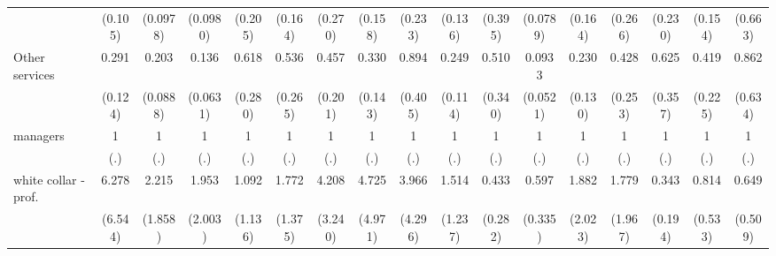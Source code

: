 {\begin{tabular}{l*{16}{c}}
                    &     (0.105)         &    (0.0978)         &    (0.0980)         &     (0.205)         &     (0.164)         &     (0.270)         &     (0.158)         &     (0.233)         &     (0.136)         &     (0.395)         &    (0.0789)         &     (0.164)         &     (0.266)         &     (0.230)         &     (0.154)         &     (0.663)         \\
[1em]
Other services      &       0.291\sym{**} &       0.203\sym{***}&       0.136\sym{***}&       0.618         &       0.536         &       0.457         &       0.330\sym{*}  &       0.894         &       0.249\sym{**} &       0.510         &      0.0933\sym{***}&       0.230\sym{**} &       0.428         &       0.625         &       0.419         &       0.862         \\
                    &     (0.124)         &    (0.0888)         &    (0.0631)         &     (0.280)         &     (0.265)         &     (0.201)         &     (0.143)         &     (0.405)         &     (0.114)         &     (0.340)         &    (0.0521)         &     (0.130)         &     (0.253)         &     (0.357)         &     (0.225)         &     (0.634)         \\
[1em]
managers            &           1         &           1         &           1         &           1         &           1         &           1         &           1         &           1         &           1         &           1         &           1         &           1         &           1         &           1         &           1         &           1         \\
                    &         (.)         &         (.)         &         (.)         &         (.)         &         (.)         &         (.)         &         (.)         &         (.)         &         (.)         &         (.)         &         (.)         &         (.)         &         (.)         &         (.)         &         (.)         &         (.)         \\
[1em]
white collar - prof.&       6.278         &       2.215         &       1.953         &       1.092         &       1.772         &       4.208         &       4.725         &       3.966         &       1.514         &       0.433         &       0.597         &       1.882         &       1.779         &       0.343         &       0.814         &       0.649         \\
                    &     (6.544)         &     (1.858)         &     (2.003)         &     (1.136)         &     (1.375)         &     (3.240)         &     (4.971)         &     (4.296)         &     (1.237)         &     (0.282)         &     (0.335)         &     (2.023)         &     (1.967)         &     (0.194)         &     (0.533)         &     (0.509)         \\

\end{tabular}}
